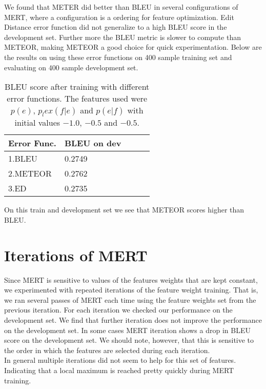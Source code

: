 \documentclass[11pt]{article}
\begin{document}
We found that METER did better than BLEU in several configurations of
MERT, where a configuration is a ordering for feature optimization. Edit
Distance error function did not generalize to a high BLEU score in the
development set.
Further more the BLEU metric is slower to compute than METEOR, making METEOR a
good choice for quick experimentation. Below are the results on using these
error functions on 400 sample training set and evaluating on 400
sample development set.
\begin{table}[h]
\begin{center}
\begin{singlespace}
\begin{tabular}{|l|l|l|l|l|}
\hline \bf Error Func. &  \bf BLEU on dev \\ \hline
1.BLEU & 0.2749 \\
2.METEOR & 0.2762\\
3.ED & 0.2735\\
\hline
\end{tabular}
\end{singlespace}
\end{center}
\caption{ BLEU score after training with different error functions. The features
used were $p(e)$, $p_lex(f|e)$ and $p(e|f)$ with initial values $-1.0$, $-0.5$
and $-0.5$.}
\end{table}
On this train and development set we see that METEOR scores higher than BLEU.
\section{Iterations of MERT}
Since MERT is sensitive to values of the features weights that are kept
constant, we experimented with repeated iterations of the feature weight
training. That is, we ran several passes of MERT each time using the feature
weights set from the previous iteration. For each iteration we checked our
performance on the development set. We find that further iteration does not
improve the performance on the development set. In some cases MERT iteration
shows a drop in BLEU score on the development set. We should note, however, that
this is sensitive to the order in which the features are selected during each
iteration.\\
In general multiple iterations did not seem to help for this set of features.
Indicating that a local maximum is reached pretty quickly during MERT training.
\end{document}
